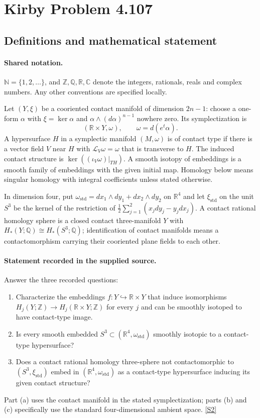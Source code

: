 \documentclass[11pt]{article}
\newcommand{\sref}[2]{\hyperlink{source:#1:#2}{[S#2]}}
\begin{document}
\section{Kirby Problem 4.107}\label{statement}

\subsection{Definitions and mathematical statement}

\paragraph{Shared notation.}$\mathbb N=\{1,2,\ldots\}$, and $\mathbb Z,\mathbb Q,\mathbb R,\mathbb C$ denote the integers, rationals, reals and complex numbers. Any other conventions are specified locally.


Let $(Y,\xi)$ be a cooriented contact manifold of dimension $2n-1$: choose a one-form $\alpha$ with $\xi=\ker\alpha$ and $\alpha\wedge(d\alpha)^{n-1}$ nowhere zero. Its symplectization is
\[
(\mathbb R\times Y,\omega),\qquad \omega=d(e^t\alpha).
\]
A hypersurface $H$ in a symplectic manifold $(M,\omega)$ is of contact type if there is a vector field $V$ near $H$ with $\mathcal L_V\omega=\omega$ that is transverse to $H$. The induced contact structure is $\ker((\iota_V\omega)|_{TH})$. A smooth isotopy of embeddings is a smooth family of embeddings with the given initial map. Homology below means singular homology with integral coefficients unless stated otherwise.

In dimension four, put $\omega_{\mathrm{std}}=dx_1\wedge dy_1+dx_2\wedge dy_2$ on $\mathbb R^4$ and let $\xi_{\mathrm{std}}$ on the unit $S^3$ be the kernel of the restriction of $\tfrac12\sum_{j=1}^2(x_jdy_j-y_jdx_j)$. A contact rational homology sphere is a closed contact three-manifold $Y$ with $H_*(Y;\mathbb Q)\cong H_*(S^3;\mathbb Q)$; identification of contact manifolds means a contactomorphism carrying their cooriented plane fields to each other.
\paragraph{Statement recorded in the supplied source.}
Answer the three recorded questions:
\begin{enumerate}
\item[(a)] Characterize the embeddings $f:Y\hookrightarrow\mathbb R\times Y$ that induce isomorphisms $H_j(Y;\mathbb Z)\to H_j(\mathbb R\times Y;\mathbb Z)$ for every $j$ and can be smoothly isotoped to have contact-type image.
\item[(b)] Is every smooth embedded $S^3\subset(\mathbb R^4,\omega_{\mathrm{std}})$ smoothly isotopic to a contact-type hypersurface?
\item[(c)] Does a contact rational homology three-sphere not contactomorphic to $(S^3,\xi_{\mathrm{std}})$ embed in $(\mathbb R^4,\omega_{\mathrm{std}})$ as a contact-type hypersurface inducing its given contact structure?
\end{enumerate}
Part (a) uses the contact manifold in the stated symplectization; parts (b) and (c) specifically use the standard four-dimensional ambient space. \sref{statement}{2}
\end{document}
